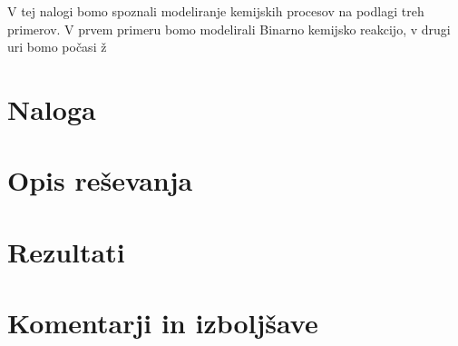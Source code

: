 \documentclass[a4paper]{article}
\begin{document}
V tej nalogi bomo spoznali modeliranje kemijskih procesov na podlagi treh primerov. V prvem primeru bomo
modelirali Binarno kemijsko reakcijo, v drugi uri bomo počasi ž

\section{Naloga}

\section{Opis reševanja}

\section{Rezultati}


\section{Komentarji in izboljšave}

\newpage


\end{document}
